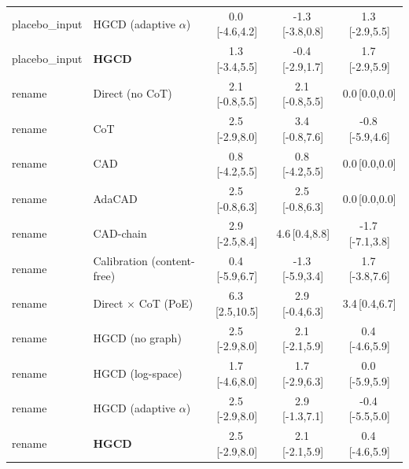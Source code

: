 \begin{tabular}{llccc}
placebo\_input & HGCD (adaptive $\alpha$) & 0.0\,{\scriptsize[-4.6,4.2]} & -1.3\,{\scriptsize[-3.8,0.8]} & 1.3\,{\scriptsize[-2.9,5.5]} \\
placebo\_input & \textbf{HGCD} & 1.3\,{\scriptsize[-3.4,5.5]} & -0.4\,{\scriptsize[-2.9,1.7]} & 1.7\,{\scriptsize[-2.9,5.9]} \\
\midrule
rename & Direct (no CoT) & 2.1\,{\scriptsize[-0.8,5.5]} & 2.1\,{\scriptsize[-0.8,5.5]} & 0.0\,{\scriptsize[0.0,0.0]} \\
rename & CoT & 2.5\,{\scriptsize[-2.9,8.0]} & 3.4\,{\scriptsize[-0.8,7.6]} & -0.8\,{\scriptsize[-5.9,4.6]} \\
rename & CAD & 0.8\,{\scriptsize[-4.2,5.5]} & 0.8\,{\scriptsize[-4.2,5.5]} & 0.0\,{\scriptsize[0.0,0.0]} \\
rename & AdaCAD & 2.5\,{\scriptsize[-0.8,6.3]} & 2.5\,{\scriptsize[-0.8,6.3]} & 0.0\,{\scriptsize[0.0,0.0]} \\
rename & CAD-chain & 2.9\,{\scriptsize[-2.5,8.4]} & 4.6\,{\scriptsize[0.4,8.8]} & -1.7\,{\scriptsize[-7.1,3.8]} \\
rename & Calibration (content-free) & 0.4\,{\scriptsize[-5.9,6.7]} & -1.3\,{\scriptsize[-5.9,3.4]} & 1.7\,{\scriptsize[-3.8,7.6]} \\
rename & Direct $\times$ CoT (PoE) & 6.3\,{\scriptsize[2.5,10.5]} & 2.9\,{\scriptsize[-0.4,6.3]} & 3.4\,{\scriptsize[0.4,6.7]} \\
rename & HGCD (no graph) & 2.5\,{\scriptsize[-2.9,8.0]} & 2.1\,{\scriptsize[-2.1,5.9]} & 0.4\,{\scriptsize[-4.6,5.9]} \\
rename & HGCD (log-space) & 1.7\,{\scriptsize[-4.6,8.0]} & 1.7\,{\scriptsize[-2.9,6.3]} & 0.0\,{\scriptsize[-5.9,5.9]} \\
rename & HGCD (adaptive $\alpha$) & 2.5\,{\scriptsize[-2.9,8.0]} & 2.9\,{\scriptsize[-1.3,7.1]} & -0.4\,{\scriptsize[-5.5,5.0]} \\
rename & \textbf{HGCD} & 2.5\,{\scriptsize[-2.9,8.0]} & 2.1\,{\scriptsize[-2.1,5.9]} & 0.4\,{\scriptsize[-4.6,5.9]} \\
\bottomrule
\end{tabular}
